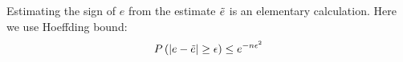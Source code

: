 Estimating the sign of $e$ from the estimate $\tilde{e}$ is an
elementary calculation. Here we use Hoeffding bound:
\begin{equation}
  P\left( |e -\tilde{e}| \geq \epsilon \right)
  \leq e^{-n \epsilon^2}
\end{equation}
\fi

